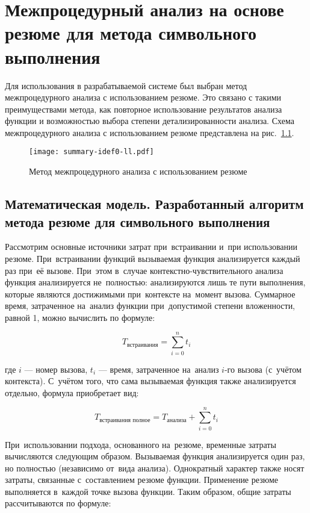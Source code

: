 \chapter{Межпроцедурный анализ на основе резюме для метода символьного выполнения} \label{chapt2}

Для использования в разрабатываемой системе был выбран метод межпроцедурного анализа с использованием резюме.
Это связано с такими преимуществами метода, как повторное использование результатов анализа функции и возможностью выбора степени детализированности анализа. Схема межпроцедурного анализа с использованием резюме представлена на рис.~\ref{pic:summary-idef0-ll}.

\begin{figure}
   \centering
   \texttt{[image: summary-idef0-ll.pdf]}
   \caption{Метод межпроцедурного анализа с использованием резюме}\label{pic:summary-idef0-ll}
\end{figure}


\section{Математическая модель. Разработанный алгоритм метода резюме для символьного выполнения}

Рассмотрим основные источники затрат при~встраивании и~при использовании резюме. При~встраивании функций вызываемая функция анализируется каждый раз при~её вызове. При~этом в~случае контекстно-чувствительного анализа функция анализируется не~полностью: анализируются лишь те пути выполнения, которые являются достижимыми при~контексте на~момент вызова. Суммарное время, затраченное на~анализ функции при~допустимой степени вложенности, равной 1, можно вычислить по формуле:

\begin{equation}
 T_{\text{встраивания}} = \sum_{i = 0}^{n} t_i 
\end{equation}

где $i$ — номер вызова, $t_i$ — время, затраченное на~анализ $i$-го вызова (с~учётом контекста). С~учётом того, что сама вызываемая функция также анализируется отдельно, формула приобретает вид:

\begin{equation}
 T_{\text{встраивания полное}} = T_{\text{анализа}} + \sum_{i = 0}^{n} t_i 
\end{equation}

При~использовании подхода, основанного на~резюме, временные затраты вычисляются следующим образом. Вызываемая функция анализируется один раз, но полностью (независимо от~вида анализа). Однократный характер также носят затраты, связанные с~составлением резюме функции. Применение резюме выполняется в~каждой точке вызова функции. Таким образом, общие затраты рассчитываются по формуле:

